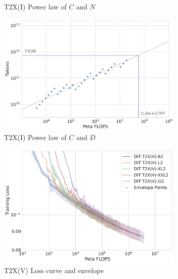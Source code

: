\begin{figure}[t]
\begin{subfigure}{0.325\textwidth}
        \caption{T2X(I) Power law of $C$ and $N$}
        \label{fig:computation-vs-parameter}
    \end{subfigure}
    \hfill
    \begin{subfigure}{0.325\textwidth}
        \centering
        \includegraphics[width=\textwidth]{figures/computation_vs_token.pdf}
        \caption{T2X(I) Power law of $C$ and $D$}
        \label{fig:computation-vs-token}
    \end{subfigure}
    \hfill
    \begin{subfigure}{0.325\textwidth}
        \centering
        \includegraphics[width=\textwidth]{figures/video_scaling_law.pdf}
        \caption{T2X(V) Loss curve and envelope}
        \label{fig:video-scaling-laws}
    \end{subfigure}
    \hfill
    \begin{subfigure}{0.325\textwidth}
        \centering

\end{subfigure}
\end{figure}
